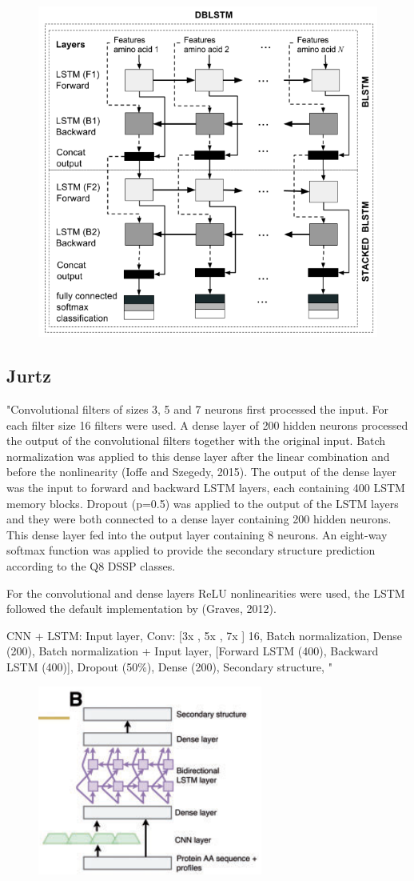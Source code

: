 \documentclass[]{scrartcl}
\begin{document}
\begin{figure}[h]
	\centering
	\includegraphics[width=0.7\linewidth]{DBLSTM}
	\label{fig:DBLSTM}
\end{figure}

\subsection{Jurtz}
"Convolutional filters of sizes 3, 5 and 7 neurons first processed the input. For each filter size 16 filters were used. A dense layer of 200 hidden neurons processed the output of the convolutional filters together with the original input. Batch normalization was applied to this dense layer after the linear combination and before the nonlinearity (Ioffe and Szegedy, 2015). The output of the dense layer was the input to forward and backward LSTM layers, each containing 400 LSTM memory blocks. Dropout (p=0.5) was applied to the output of the LSTM layers and they were both connected to a dense layer containing 200 hidden neurons. This dense layer fed into the output layer containing 8 neurons. An eight-way softmax function was applied to provide the secondary structure prediction according to the Q8 DSSP classes.

For the convolutional and dense layers ReLU nonlinearities were used, the LSTM followed the default implementation by (Graves, 2012).

CNN + LSTM:
Input layer,
Conv: [3x , 5x , 7x ] 16,
Batch normalization,
Dense (200),
Batch normalization + Input layer,
[Forward LSTM (400), Backward LSTM (400)],
Dropout (50\%),
Dense (200),
Secondary structure,
" \cite{Jurtz2017}
\begin{figure}
\centering
\includegraphics[width=0.5\linewidth]{jurtz}
\label{fig:jurtz}
\end{figure}
\end{document}
